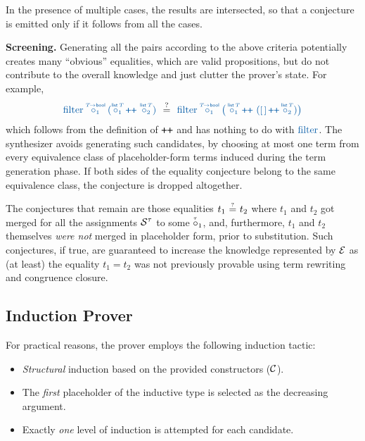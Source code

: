 In the presence of multiple cases, the results are intersected, so that a conjecture is emitted only if it follows from all the cases.

\begin{comment}  %
The two terms on the top row will not be merged. This is because,
for example, for the valuation $\big\{
    \pholder{1}{\tlist\,T}\mapsto[], 
    \pholder{2}{\tlist\,T}\mapsto l_1,
    \pholder{2}{T~}\mapsto v_1
\big\}$,
The left one expands to $[]$ whereas the right expands to $l_1$.
\end{comment}

\begin{paragraph}{\bf Screening.}
Generating all the pairs according to the above criteria potentially creates many ``obvious'' equalities, which are valid propositions, but do not contribute to the overall knowledge and just clutter the prover's state.
For example,
\[
{\clrterm
\tfilter\pholder{1}{T\!\to\tbool}
 ({\pholder{1}{\tlist\,T}} \concat\, {\pholder{2}{\tlist\,T}})} ~\maybeEq~
{\clrterm
\tfilter\pholder{1}{T\!\to\tbool}
  \big(\,{\pholder{1}{\tlist\,T}} \concat\,
  {(\lnil \concat {\pholder{2}{\tlist\,T}})}\big)}
\]
which follows from the definition of ${\concat}$ and has nothing to do with
$\clrterm\tfilter$. 
The synthesizer avoids generating such candidates, by
choosing at most one term from every equivalence class
of placeholder-form terms induced during the term generation phase.
If both sides of the equality conjecture belong to the same equivalence class, the conjecture is dropped altogether.
\end{paragraph}

The conjectures that remain are those equalities $t_1\operatorname{\overset{\scriptscriptstyle ?}{\,=\,}} t_2$ where $t_1$ and $t_2$ got merged for all the assignments $\mathcal{S}^{\tau}$ to some $\pholder{1}{\tau~\,}$, and, furthermore, $t_1$ and $t_2$ themselves \emph{were not} merged in placeholder form,
prior to substitution.
Such conjectures, if true, are guaranteed to increase the knowledge represented by $\mathcal{E}$ as (at least) the equality $t_1=t_2$ was not previously provable using term rewriting and congruence closure.

\subsection{Induction Prover}
\label{overview:induction}

For practical reasons, the prover employs the following induction tactic:
\begin{itemize}
  \item \emph{Structural} induction based on the provided 
    constructors ($\mathcal{C}$).
  \item The \emph{first} placeholder of the inductive type is selected as the decreasing argument.
   \item Exactly \emph{one} level of induction is attempted for each candidate.
\end{itemize}

